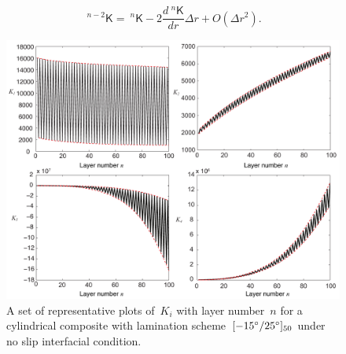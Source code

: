\documentclass[preprint,10pt,times]{elsarticle}
\numberwithin{equation}{section}
\renewcommand{\u}[1]{\boldsymbol{#1}}
\newcommand{\usf}[1]{\u{\mathsf #1}}
\renewcommand{\>}{$\Rightarrow$}
\begin{document}
\begin{equation}
	~^{{n-2}}{\usf{K}} = ~^{n}{\usf{K}} - 2\frac{d~^{n}{\usf{K}}}{dr} \Delta r + O(\Delta r^2).
	\label{eq:knknm2appr2}
\end{equation}
\begin{figure}[t]
	\centering
	\graphicspath{{../LyxFiles/figure/}}
	\includegraphics[width=1\textwidth]{two_material_no_slip_Ks.pdf}
	\caption{A set of representative plots of~$K_i$ with layer number~$n$ for a cylindrical composite with lamination scheme~$[-15 \degree/25 \degree]_{50}$ under no slip interfacial condition.}
	\label{fig:two_material_no_slip_Ks}
\end{figure}
\end{document}
